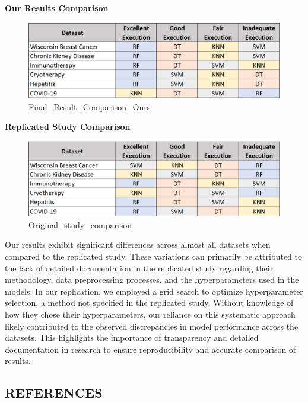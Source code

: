 \documentclass[11pt]{article}
\begin{document}
    \textbf{Our Results Comparison}

    \begin{figure}
\centering
\includegraphics{images/Final_Result_Comparison_Ours.PNG}
\caption{Final\_Result\_Comparison\_Ours}
\end{figure}

    \textbf{Replicated Study Comparison}

    \begin{figure}
\centering
\includegraphics{images/Original_study_comparison.PNG}
\caption{Original\_study\_comparison}
\end{figure}

    Our results exhibit significant differences across almost all datasets
when compared to the replicated study. These variations can primarily be
attributed to the lack of detailed documentation in the replicated study
regarding their methodology, data preprocessing processes, and the
hyperparameters used in the models. In our replication, we employed a
grid search to optimize hyperparameter selection, a method not specified
in the replicated study. Without knowledge of how they chose their
hyperparameters, our reliance on this systematic approach likely
contributed to the observed discrepancies in model performance across
the datasets. This highlights the importance of transparency and
detailed documentation in research to ensure reproducibility and
accurate comparison of results.

    \hypertarget{references}{%
\subsection{REFERENCES}\label{references}}
\end{document}
